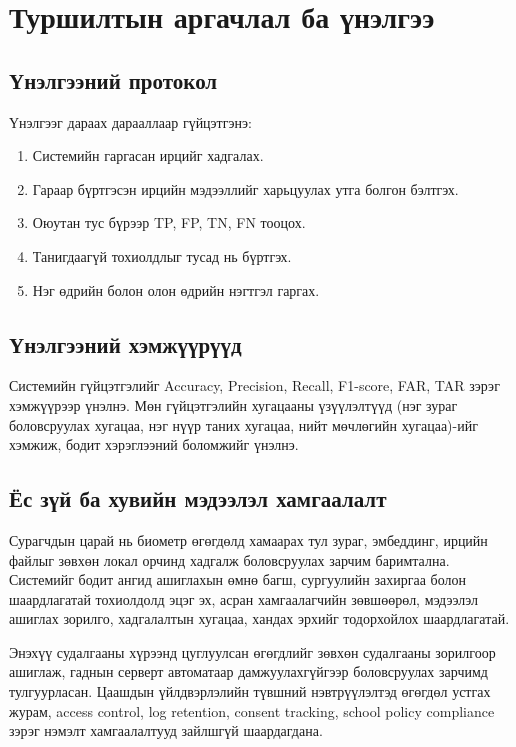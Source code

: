 \section{Туршилтын аргачлал ба үнэлгээ}

\subsection{Үнэлгээний протокол}

Үнэлгээг дараах дарааллаар гүйцэтгэнэ:

\begin{enumerate}
  \item Системийн гаргасан ирцийг хадгалах.
  \item Гараар бүртгэсэн ирцийн мэдээллийг харьцуулах утга болгон бэлтгэх.
  \item Оюутан тус бүрээр TP, FP, TN, FN тооцох.
  \item Танигдаагүй тохиолдлыг тусад нь бүртгэх.
  \item Нэг өдрийн болон олон өдрийн нэгтгэл гаргах.
\end{enumerate}

\subsection{Үнэлгээний хэмжүүрүүд}

Системийн гүйцэтгэлийг Accuracy, Precision, Recall, F1-score, FAR, TAR зэрэг хэмжүүрээр үнэлнэ. Мөн гүйцэтгэлийн хугацааны үзүүлэлтүүд (нэг зураг боловсруулах хугацаа, нэг нүүр таних хугацаа, нийт мөчлөгийн хугацаа)-ийг хэмжиж, бодит хэрэглээний боломжийг үнэлнэ.

\subsection{Ёс зүй ба хувийн мэдээлэл хамгаалалт}
Сурагчдын царай нь биометр өгөгдөлд хамаарах тул зураг, эмбеддинг, ирцийн файлыг зөвхөн локал орчинд хадгалж боловсруулах зарчим баримтална. Системийг бодит ангид ашиглахын өмнө багш, сургуулийн захиргаа болон шаардлагатай тохиолдолд эцэг эх, асран хамгаалагчийн зөвшөөрөл, мэдээлэл ашиглах зорилго, хадгалалтын хугацаа, хандах эрхийг тодорхойлох шаардлагатай.

Энэхүү судалгааны хүрээнд цуглуулсан өгөгдлийг зөвхөн судалгааны зорилгоор ашиглаж, гаднын серверт автоматаар дамжуулахгүйгээр боловсруулах зарчимд тулгуурласан. Цаашдын үйлдвэрлэлийн түвшний нэвтрүүлэлтэд өгөгдөл устгах журам, access control, log retention, consent tracking, school policy compliance зэрэг нэмэлт хамгаалалтууд зайлшгүй шаардагдана.
\FloatBarrier